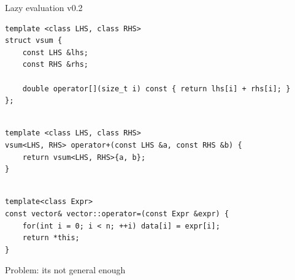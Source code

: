 \documentclass[@BEAMER_OPTIONS@]{beamer}
\begin{document}
\note{ }

\begin{frame}[fragile,shrink=2]{Lazy evaluation v0.2}
    \begin{exampleblock}{}
        \begin{lstlisting}
template <class LHS, class RHS>
struct vsum {
    const LHS &lhs;
    const RHS &rhs;

    double operator[](size_t i) const { return lhs[i] + rhs[i]; }
};
        \end{lstlisting}
        \pause
        \begin{lstlisting}[firstnumber=last]

template <class LHS, class RHS>
vsum<LHS, RHS> operator+(const LHS &a, const RHS &b) {
    return vsum<LHS, RHS>{a, b};
}
        \end{lstlisting}
        \pause
        \begin{lstlisting}[firstnumber=last]

template<class Expr>
const vector& vector::operator=(const Expr &expr) {
    for(int i = 0; i < n; ++i) data[i] = expr[i];
    return *this;
}
        \end{lstlisting}
    \end{exampleblock}
\end{frame}

\note{ }

\begin{frame}{Problem: its not general enough}
    \begin{figure}
    \end{figure}
\end{frame}
\end{document}
